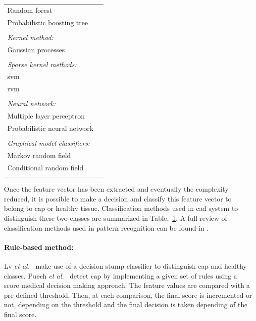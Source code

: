 \begin{table}
\begin{tabular}{p{.60\linewidth} p{.30\linewidth}}
    \quad Random forest & \cite{Kelm2007,Litjens2014,Tiwari2012,Tiwari2013,Viswanath2009} \\
    \quad Probabilistic boosting tree & \cite{Tiwari2009,Tiwari2010,Tiwari2012} \\ \\ [-1.5ex]
    \textit{Kernel method:} & \\
    \quad Gaussian processes & \cite{Kelm2007} \\ \\ [-1.5ex]
    \textit{Sparse kernel methods:} & \\
    \quad \acs{svm} & \cite{Artan2009,Artan2010,Chan2003,Litjens2011,Litjens2012,Liu2013,Lopes2011,Niaf2011,Niaf2012,Ozer2009,Ozer2010,Parfait2012,Peng2013,Sung2011,Tiwari2012,Vos2008,Vos2008a,Vos2010,Vos2012} \\
    \quad \acs{rvm} & \cite{Ozer2009,Ozer2010} \\ \\ [-1.5ex]
    \textit{Neural network:} & \\ 
    \quad Multiple layer perceptron & \cite{Matulewicz2013,Parfait2012} \\
    \quad Probabilistic neural network & \cite{Ampeliotis2007,Ampeliotis2008,Viswanath2011} \\ \\ [-1.5ex]
    \textit{Graphical model classifiers:} & \\
    \quad Markov random field & \cite{Liu2009,Ozer2010} \\
    \quad Conditional random field & \cite{Artan2009,Artan2010} \\ \\ [-1.5ex]
    \hline
  \end{tabular}
\label{tab:class}
\end{table}



Once the feature vector has been extracted and eventually the complexity reduced, it is possible to make a decision and classify this feature vector to belong to \ac{cap} or healthy tissue.
Classification methods used in \ac{cad} system to distinguish these two classes are summarized in Table.~\ref{tab:class}.
A full review of classification methods used in pattern recognition can be found in \cite{Bishop2006}.


\paragraph{Rule-based method:}
Lv \textit{et al.}~\cite{Lv2009} make use of a decision stump classifier to distinguish \ac{cap} and healthy classes. 
Puech \textit{et al.}~\cite{Puech2009} detect \ac{cap} by implementing a given set of rules using a score medical decision making approach.
The feature values are compared with a pre-defined threshold.
Then, at each comparison, the final score is incremented or not, depending on the threshold and the final decision is taken depending of the final score.

